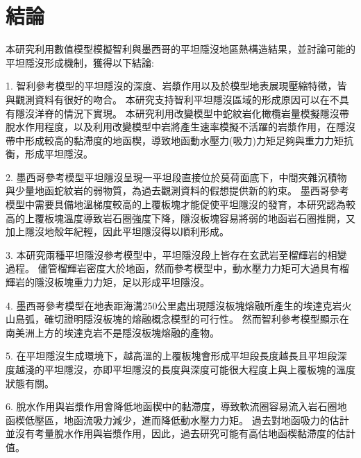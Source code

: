 
\chapter{結論}

本研究利用數值模型模擬智利與墨西哥的平坦隱沒地區熱構造結果，並討論可能的平坦隱沒形成機制，獲得以下結論:

1. 智利參考模型的平坦隱沒的深度、岩漿作用以及於模型地表展現壓縮特徵，皆與觀測資料有很好的吻合。
本研究支持智利平坦隱沒區域的形成原因可以在不具有隱沒洋脊的情況下實現。
本研究利用改變模型中蛇紋岩化橄欖岩量模擬隱沒帶脫水作用程度，以及利用改變模型中岩將產生速率模擬不活躍的岩漿作用，在隱沒帶中形成較高的黏滯度的地函楔，導致地函動水壓力(吸力)力矩足夠與重力力矩抗衡，形成平坦隱沒。

2. 墨西哥參考模型平坦隱沒呈現一平坦段直接位於莫荷面底下，中間夾雜沉積物與少量地函蛇紋岩的弱物質，為過去觀測資料的假想提供新的約束。
墨西哥參考模型中需要具備地溫梯度較高的上覆板塊才能促使平坦隱沒的發育，本研究認為較高的上覆板塊溫度導致岩石圈強度下降，隱沒板塊容易將弱的地函岩石圈推開，又加上隱沒地殼年紀輕，因此平坦隱沒得以順利形成。

3. 本研究兩種平坦隱沒參考模型中，平坦隱沒段上皆存在玄武岩至榴輝岩的相變過程。
儘管榴輝岩密度大於地函，然而參考模型中，動水壓力力矩可大過具有榴輝岩的隱沒板塊重力力矩，足以形成平坦隱沒。


4. 墨西哥參考模型在地表距海溝250公里處出現隱沒板塊熔融所產生的埃達克岩火山島弧，確切證明隱沒板塊的熔融概念模型的可行性。
然而智利參考模型顯示在南美洲上方的埃達克岩不是隱沒板塊熔融的產物。

5. 在平坦隱沒生成環境下，越高溫的上覆板塊會形成平坦段長度越長且平坦段深度越淺的平坦隱沒，亦即平坦隱沒的長度與深度可能很大程度上與上覆板塊的溫度狀態有關。

6. 脫水作用與岩漿作用會降低地函楔中的黏滯度，導致軟流圈容易流入岩石圈地函楔低壓區，地函流吸力減少，進而降低動水壓力力矩。
過去對地函吸力的估計並沒有考量脫水作用與岩漿作用，因此，過去研究可能有高估地函楔黏滯度的估計值。